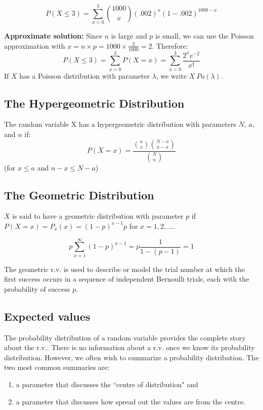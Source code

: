 \documentclass[12pt]{article}
\begin{document}
\[
    P(X \leq 3) = \sum_{x = 0}^{3} {1000 \choose x} (.002)^x (1 - .002)^{1000-x}
\]

\textbf{Approximate solution:} Since $n$ is large and $p$ is small, we can use the Poisson approximation with $x = n \times p = 1000 \times \frac{2}{1000} = 2$. Therefore:
\[
    P(X \leq 3) = \sum_{x = 0}^{3} P(X = x) = \sum_{x=0}^{3} \frac{2^x e^{-2}}{x!}
\]
If $X$ has a Poisson distribution with parameter $\lambda$, we write $X ~ Po(\lambda)$.

\subsection{The Hypergeometric Distribution}

The random variable X has a hypergeometric distribution with parameters $N$, $a$, and $n$ if:
\[
    P(X = x) = \frac{{a \choose x} {{N - a} \choose {n -x}}}{N \choose n}
\]
(for $x \leq a$ and $n-x \leq N-a$)

\subsection{The Geometric Distribution}

$X$ is said to have a geometric distribution with parameter $p$ if $P(X = x) = P_x (x) = (1-p)^{x-1} p$ for $x = 1, 2, \ldots$.

\[
    p \sum_{x = 1}^{\infty} (1-p)^{x-1} = p \frac{1}{1-(p-1)} = 1
\]

The geometric r.v. is used to describe or model the trial number at which the first success occurs in a sequence of independent Bernoulli trials, each with the probability of success $p$.

\subsection{Expected values}
The probability distribution of a random variable provides the complete story about the r.v.. There is no information about a r.v. once we know its probability distribution. However, we often wish to summarize a probability distribution. The two most common summaries are:
\begin{enumerate}
    \item a parameter that discusses the ``centre of distribution" and
    \item a parameter that discusses how spread out the values are from the centre.
\end{enumerate}
\end{document}
